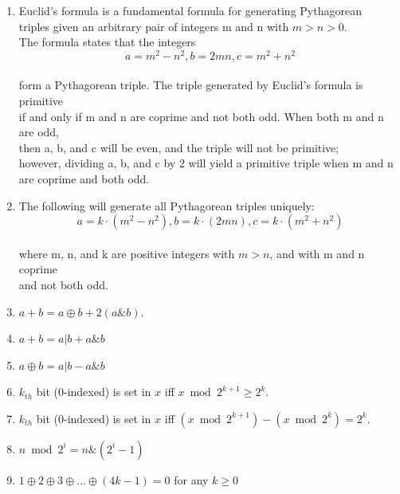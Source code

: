 \begin{enumerate}
  \item Euclid's formula is a fundamental formula for generating Pythagorean\\
  triples given an arbitrary pair of integers m and n with $m > n > 0$. \\
  The formula states that the integers\\
  $$a = m^2 - n^2, b = 2mn, c = m^2 + n^2$$\\
  form a Pythagorean triple. The triple generated by Euclid's formula is primitive \\
  if and only if m and n are coprime and not both odd. When both m and n are odd, \\
  then a, b, and c will be even, and the triple will not be primitive; \\
  however, dividing a, b, and c by 2 will yield a primitive triple when m and n \\
  are coprime and both odd.

  \item The following will generate all Pythagorean triples uniquely:  \\
  $$a = k \cdot (m^2 - n^2) , b = k \cdot (2mn) , c = k \cdot (m^2 + n^2)$$\\
  where m, n, and k are positive integers with $m > n$, and with m and n coprime \\
  and not both odd.  

  \item $a + b = a \oplus b + 2(a \& b)$.
  \item $a + b = a | b + a \& b$
  \item $a \oplus b = a | b - a \& b$
  \item $k_{th}$ bit (0-indexed) is set in $x$ iff $x \bmod 2^{k+1} \ge 2^k$.
  \item $k_{th}$ bit (0-indexed) is set in $x$ iff $(x \bmod 2^{k+1}) - (x \bmod 2^k) = 2^k$.
  \item $n \bmod 2^i = n \& (2^i - 1)$
  \item $1 \oplus 2 \oplus 3 \oplus \dots \oplus (4k - 1) = 0$ for any $k \ge 0$
\end{enumerate}
